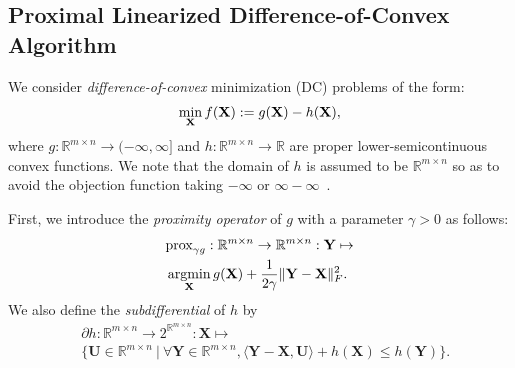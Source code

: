 \documentclass[10pt,journal]{IEEEtran}
\theoremstyle{plain}
\newcommand{\argmin}{\mathop{\rm argmin}\limits}
\begin{document}
\subsection{Proximal Linearized Difference-of-Convex Algorithm}
We consider \textit{difference-of-convex} minimization (DC) problems of the form:
\begin{equation}
    \label{prob:DC_general}
    \min_{\mathbf{X}} f(\mathbf{X}) := g(\mathbf{X}) - h(\mathbf{X}),
\end{equation}
where $g:\mathbb{R}^{m\times n}\rightarrow (-\infty, \infty]$ and $h:\mathbb{R}^{m\times n}\rightarrow \mathbb{R}$ are proper lower-semicontinuous convex functions. We note that the domain of $h$ is assumed to be $\mathbb{R}^{m\times n}$ so as to avoid the objection function taking $-\infty$ or $\infty-\infty$~\cite{zhang2023inexact}.

First, we introduce the \textit{proximity operator} of $g$ with a parameter $\gamma > 0$ as follows: 
\begin{align}
    &\mathrm{prox}_{\gamma g}:\mathbb{R}^{m\times n}\rightarrow\mathbb{R}^{m\times n}:\mathbf{Y}\mapsto\nonumber\\
    &\argmin_{\mathbf{X}} g(\mathbf{X}) + \frac{1}{2\gamma} \| \mathbf{Y} - \mathbf{X} \|_{F}^{2}.    \label{eq:prox_g}
\end{align}
We also define the \textit{subdifferential}
of $h$ by
\begin{align}
    & \partial h:\mathbb{R}^{m\times n}\rightarrow 2^{\mathbb{R}^{m\times n}}:\mathbf{X}\mapsto  \nonumber \\
    & \{ \mathbf{U} \in \mathbb{R}^{m\times n} \: | \: \forall \mathbf{Y} \in \mathbb{R}^{m\times n}, \langle \mathbf{Y} - \mathbf{X}, \mathbf{U} \rangle + h(\mathbf{X}) \leq h(\mathbf{Y}) \}.
    \label{eq:subdiff}
\end{align}
\end{document}
